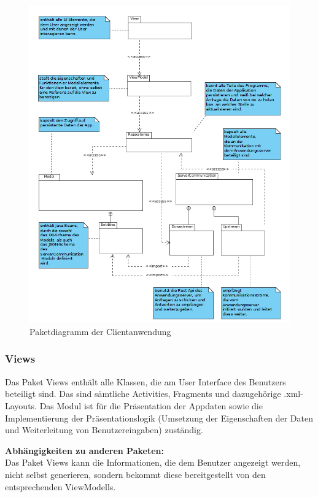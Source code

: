 \documentclass[11pt,a4paper]{article}
\begin{document}
\begin{figure}[H]
	\centering
	\includegraphics[scale=0.5]{../Klassendiagramme/paketdiagramm_client.png}
	\caption{Paketdiagramm der Clientanwendung}
\end{figure}

\subsubsection{Views}
Das Paket Views enthält alle Klassen, die am User Interface des Benutzers beteiligt sind. Das sind sämtliche Activities, Fragments und dazugehörige .xml-Layouts. Das Modul ist für die Präsentation der Appdaten sowie die Implementierung der Präsentationslogik (Umsetzung der Eigenschaften der Daten und Weiterleitung von Benutzereingaben) zuständig.

\textbf{Abhängigkeiten zu anderen Paketen:}\\
Das Paket Views kann die Informationen, die dem Benutzer angezeigt werden, nicht selbst generieren, sondern bekommt diese bereitgestellt von den entsprechenden ViewModells.
\end{document}
